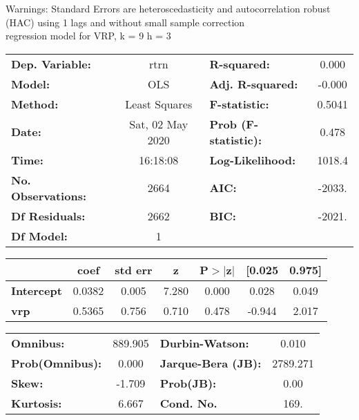 Warnings: \newline
 [1] Standard Errors are heteroscedasticity and autocorrelation robust (HAC) using 1 lags and without small sample correction\\ 

regression model for VRP, k = 9 h = 3\begin{center}
\begin{tabular}{lclc}
\toprule
\textbf{Dep. Variable:}    &       rtrn       & \textbf{  R-squared:         } &     0.000   \\
\textbf{Model:}            &       OLS        & \textbf{  Adj. R-squared:    } &    -0.000   \\
\textbf{Method:}           &  Least Squares   & \textbf{  F-statistic:       } &    0.5041   \\
\textbf{Date:}             & Sat, 02 May 2020 & \textbf{  Prob (F-statistic):} &    0.478    \\
\textbf{Time:}             &     16:18:08     & \textbf{  Log-Likelihood:    } &    1018.4   \\
\textbf{No. Observations:} &        2664      & \textbf{  AIC:               } &    -2033.   \\
\textbf{Df Residuals:}     &        2662      & \textbf{  BIC:               } &    -2021.   \\
\textbf{Df Model:}         &           1      & \textbf{                     } &             \\
\bottomrule
\end{tabular}
\begin{tabular}{lcccccc}
                   & \textbf{coef} & \textbf{std err} & \textbf{z} & \textbf{P$> |$z$|$} & \textbf{[0.025} & \textbf{0.975]}  \\
\midrule
\textbf{Intercept} &       0.0382  &        0.005     &     7.280  &         0.000        &        0.028    &        0.049     \\
\textbf{vrp}       &       0.5365  &        0.756     &     0.710  &         0.478        &       -0.944    &        2.017     \\
\bottomrule
\end{tabular}
\begin{tabular}{lclc}
\textbf{Omnibus:}       & 889.905 & \textbf{  Durbin-Watson:     } &    0.010  \\
\textbf{Prob(Omnibus):} &   0.000 & \textbf{  Jarque-Bera (JB):  } & 2789.271  \\
\textbf{Skew:}          &  -1.709 & \textbf{  Prob(JB):          } &     0.00  \\
\textbf{Kurtosis:}      &   6.667 & \textbf{  Cond. No.          } &     169.  \\
\bottomrule
\end{tabular}
\end{center}

